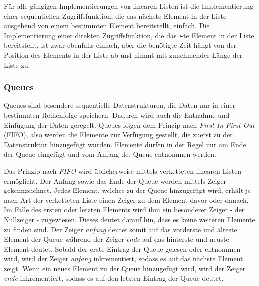 Für alle gängigen Implementierungen von linearen Listen ist die Implementierung einer sequentiellen Zugriffsfunktion, die das nächste Element in der Liste ausgehend von einem bestimmten Element bereitstellt, einfach. Die Implementierung einer direkten Zugriffsfunktion, die das \textit{i}-te Element in der Liste bereitstellt, ist zwar ebenfalls einfach, aber die benötigte Zeit hängt von der Position des Elements in der Liste ab und nimmt mit zunehmender Länge der Liste zu.\autocite[45]{ollmert_datenstrukturen_2020}

\subsubsection{Queues}
Queues sind besondere sequentielle Datenstrukturen, die Daten nur in einer bestimmten Reihenfolge speichern. Dadurch wird auch die Entnahme und Einfügung der Daten geregelt. Queues folgen dem Prinzip nach \textit{First-In-First-Out} (FIFO), also werden die Elemente zur Verfügung gestellt, die zuerst zu der Datenstruktur hinzugefügt wurden. Elemente dürfen in der Regel nur am Ende der Queue eingefügt und vom Anfang der Queue entnommen werden. \autocite[371]{gumm_band_2016}

Das Prinzip nach \textit{FIFO} wird üblicherweise mittels verketteten linearen Listen ermöglicht. Der Anfang sowie das Ende der Queue werden mittels Zeiger gekennzeichnet. Jedes Element, welches zu der Queue hinzugefügt wird, erhält je nach Art der verketteten Liste einen Zeiger zu dem Element davor oder danach. Im Falle des ersten oder letzten Elements wird ihm ein besonderer Zeiger - der Nullzeiger - zugewiesen. Dieses deutet darauf hin, dass es keine weiteren Elemente zu finden sind. Der Zeiger \textit{anfang} deutet somit auf das vorderste und älteste Element der Queue während der Zeiger \textit{ende} auf das hinterste und neuste Element deutet. Sobald der erste Eintrag der Queue gelesen oder entnommen wird, wird der Zeiger \textit{anfang} inkrementiert, sodass es auf das nächste Element zeigt. Wenn ein neues Element zu der Queue hinzugefügt wird, wird der Zeiger \textit{ende} inkrementiert, sodass es auf den letzten Eintrag der Queue deutet. \autocite[48-49]{ollmert_datenstrukturen_2020} \autocite[371]{gumm_band_2016}

